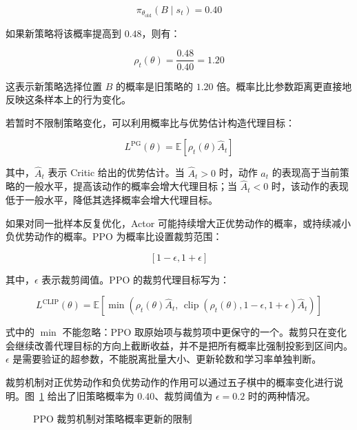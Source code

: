 \[
\pi_{\theta_{\mathrm{old}}}(B\mid s_t)=0.40
\]

如果新策略将该概率提高到 $0.48$，则有：

\begin{equation}
\rho_t(\theta)
=
\frac{0.48}{0.40}
=
1.20
\end{equation}

这表示新策略选择位置 $B$ 的概率是旧策略的 $1.20$ 倍。概率比比参数距离更直接地反映这条样本上的行为变化。

若暂时不限制策略变化，可以利用概率比与优势估计构造代理目标：

\begin{equation}
L^{\mathrm{PG}}(\theta)
=
\mathbb{E}
\left[
\rho_t(\theta)\widehat{A}_t
\right]
\end{equation}

其中，$\widehat{A}_t$ 表示 Critic 给出的优势估计。当 $\widehat{A}_t>0$ 时，动作 $a_t$ 的表现高于当前策略的一般水平，提高该动作的概率会增大代理目标；当 $\widehat{A}_t<0$ 时，该动作的表现低于一般水平，降低其选择概率会增大代理目标。

如果对同一批样本反复优化，Actor 可能持续增大正优势动作的概率，或持续减小负优势动作的概率。PPO 为概率比设置裁剪范围：

\[
[1-\epsilon,1+\epsilon]
\]

其中，$\epsilon$ 表示裁剪阈值。PPO 的裁剪代理目标写为：

\begin{equation}
L^{\mathrm{CLIP}}(\theta)
=
\mathbb{E}
\left[
\min
\left(
\rho_t(\theta)\widehat{A}_t,\,
\operatorname{clip}
\left(
\rho_t(\theta),
1-\epsilon,
1+\epsilon
\right)
\widehat{A}_t
\right)
\right]
\end{equation}

式中的 $\min$ 不能忽略：PPO 取原始项与裁剪项中更保守的一个。裁剪只在变化会继续改善代理目标的方向上截断收益，并不是把所有概率比强制投影到区间内。$\epsilon$ 是需要验证的超参数，不能脱离批量大小、更新轮数和学习率单独判断。

裁剪机制对正优势动作和负优势动作的作用可以通过五子棋中的概率变化进行说明。图~\ref{fig:ppo_clipping_mechanism} 给出了旧策略概率为 $0.40$、裁剪阈值为 $\epsilon=0.2$ 时的两种情况。

\begin{figure}[htbp]
  \centering
  \caption{PPO 裁剪机制对策略概率更新的限制}
  \label{fig:ppo_clipping_mechanism}
\end{figure}

